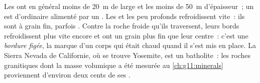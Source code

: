 Les  ont en général moins de \qty{20}{m} de large et les  moins
de \qty{50}{m} d'épaisseur~; un  est d'ordinaire alimenté par un .
Les  et les  peu profonds refroidissent vite~: ils sont à grain
fin, parfois . Contre la roche froide qu'ils traversent, leurs
bords refroidissent plus vite encore et ont un grain plus fin que leur
centre~: c'est une \emph{bordure figée}, la marque d'un corps qui était
chaud quand il s'est mis en place. La Sierra Nevada de Californie, où se
trouve Yosemite, est un batholite~: les roches granitiques dont la masse
volumique a été mesurée au \cref{ch:g11:minerals} proviennent d'environ deux
cents de ses .

